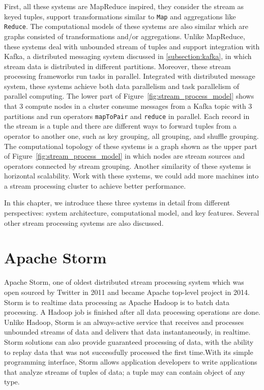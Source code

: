 First, all these systems are MapReduce inspired, they consider the stream as keyed tuples, support transformations similar to \texttt{Map} and aggregations like \texttt{Reduce}. The computational models of these systems are also similar which are graphs consisted of transformations and/or aggregations. Unlike MapReduce, these systems deal with unbounded stream of tuples and support integration with Kafka, a distributed messaging system discussed in \cref{subsection:kafka}, in which stream data is distributed in different partitions. Moreover, these stream processing frameworks run tasks in parallel. Integrated with distributed message system, these systems achieve both data parallelism and task parallelism of parallel computing. The lower part of Figure~\ref{fig:stream_process_model} shows that 3 compute nodes in a cluster consume messages from a Kafka topic with 3 partitions and run operators \texttt{mapToPair} and \texttt{reduce} in parallel. Each record in the stream is a tuple and there are different ways to forward tuples from a operator to another one, such as key grouping, all grouping, and shuffle grouping.  The computational topology of these systems is a graph shown as the upper part of Figure~\ref{fig:stream_process_model} in which nodes are stream sources and operators connected by stream grouping. Another similarity of these systems is horizontal scalability. Work with these systems, we could add more machines into a stream processing cluster to achieve better performance.


In this chapter, we introduce these three systems in detail from different perspectives: system architecture, computational model, and key features. Several other stream processing systems are also discussed. 
 
\section{Apache Storm}
Apache Storm, one of oldest distributed stream processing system which was open sourced by Twitter in 2011 and became Apache top-level project in 2014.  Storm is to realtime data processing as Apache Hadoop is to batch data processing. A Hadoop job is finished after all data processing operations are done. Unlike Hadoop, Storm is an always-active service that receives and processes unbounded streams of data and delivers that data instantaneously, in realtime. Storm solutions can also provide guaranteed processing of data, with the ability to replay data that was not successfully processed the first time.With its simple programming interface, Storm allows application developers to write applications that analyze streams of tuples of data; a tuple may can contain object of any type.

